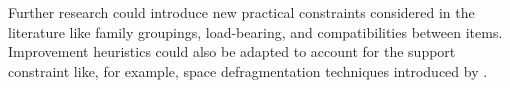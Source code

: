 \documentclass[11pt,a4paper,twocolumn]{article}
\begin{document}
Further research could introduce new practical constraints considered in the literature like family groupings, load-bearing, and compatibilities between items.
Improvement heuristics could also be adapted to account for the support constraint like, for example, space defragmentation techniques introduced by \cite{ZHU2012452}.

\begin{figure}
    \centering
    \\

\end{figure}
\end{document}
